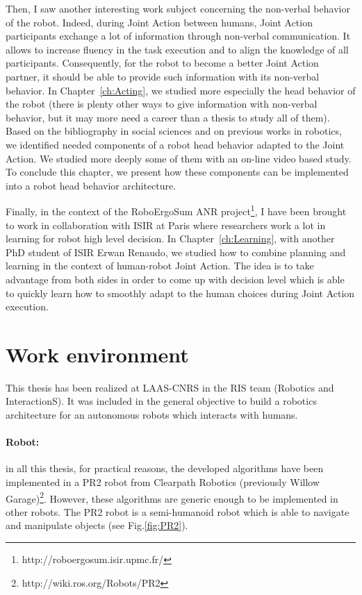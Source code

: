 \documentclass[english,a4paper,11pt,twoside]{StyleThese}
\begin{document}
Then, I saw another interesting work subject concerning the non-verbal behavior of the robot. Indeed, during Joint Action between humans, Joint Action participants exchange a lot of information through non-verbal communication. It allows to increase fluency in the task execution and to align the knowledge of all participants. Consequently, for the robot to become a better Joint Action partner, it should be able to provide such information with its non-verbal behavior. In Chapter~\ref{ch:Acting}, we studied more especially the head behavior of the robot (there is plenty other ways to give information with non-verbal behavior, but it may more need a career than a thesis to study all of them). Based on the bibliography in social sciences and on previous works in robotics, we identified needed components of a robot head behavior adapted to the Joint Action. We studied more deeply some of them with an on-line video based study. To conclude this chapter, we present how these components can be implemented into a robot head behavior architecture.

Finally, in the context of the RoboErgoSum ANR project\footnote{http://roboergosum.isir.upmc.fr/}, I have been brought to work in collaboration with ISIR at Paris where researchers work a lot in learning for robot high level decision. In Chapter~\ref{ch:Learning}, with another PhD student of ISIR Erwan Renaudo, we studied how to combine planning and learning in the context of human-robot Joint Action. The idea is to take advantage from both sides in order to come up with decision level which is able to quickly learn how to smoothly adapt to the human choices during Joint Action execution.


\section*{Work environment}

This thesis has been realized at LAAS-CNRS in the RIS team (Robotics and InteractionS). It was included in the general objective to build a robotics architecture for an autonomous robots which interacts with humans. 

\paragraph{Robot:} in all this thesis, for practical reasons, the developed algorithms have been implemented in a PR2 robot from Clearpath Robotics (previously Willow Garage)\footnote{http://wiki.ros.org/Robots/PR2}. However, these algorithms are generic enough to be implemented in other robots. The PR2 robot is a semi-humanoid robot which is able to navigate and manipulate objects (see Fig.\ref{fig:PR2}).
\end{document}

